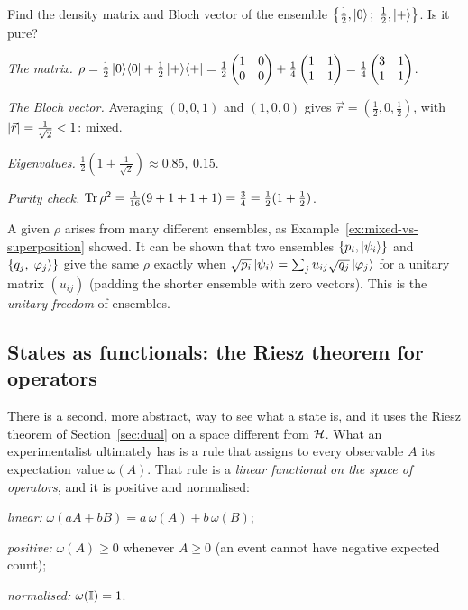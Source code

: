 \begin{example}\label{ex:mixture-bloch}
  Find the density matrix and Bloch vector of the ensemble $\bigl\{\tfrac12,\ket0;\ \tfrac12,\ket+\bigr\}$. Is it pure?
\end{example}
\begin{solution}
  \begin{steps}
    \item \emph{The matrix.} $\rho=\tfrac12\left|0\right\rangle\!\left\langle0\right|+\tfrac12\left|+\right\rangle\!\left\langle+\right|=\tfrac12\begin{pmatrix}1&0\\0&0\end{pmatrix}+\tfrac14\begin{pmatrix}1&1\\1&1\end{pmatrix}=\tfrac14\begin{pmatrix}3&1\\1&1\end{pmatrix}$.
    \item \emph{The Bloch vector.} Averaging $(0,0,1)$ and $(1,0,0)$ gives $\vec r=(\tfrac12,0,\tfrac12)$, with $\left|\vec r\right|=\tfrac1{\sqrt2}<1$: mixed.
    \item \emph{Eigenvalues.} $\tfrac12(1\pm\tfrac1{\sqrt2})\approx0.85,\ 0.15$.
    \item \emph{Purity check.} $\operatorname{Tr}\rho^2=\tfrac1{16}(9+1+1+1)=\tfrac34=\tfrac12(1+\tfrac12)$.
  \end{steps}
\end{solution}

\begin{remark}
  A given $\rho$ arises from many different ensembles, as Example~\ref{ex:mixed-vs-superposition} showed. It can be shown that two ensembles $\{p_i,\left|\psi_i\right\rangle\}$ and $\{q_j,\left|\varphi_j\right\rangle\}$ give the same $\rho$ exactly when $\sqrt{p_i}\left|\psi_i\right\rangle=\sum_ju_{ij}\sqrt{q_j}\left|\varphi_j\right\rangle$ for a unitary matrix $(u_{ij})$ (padding the shorter ensemble with zero vectors). This is the \emph{unitary freedom} of ensembles.
\end{remark}

\subsection{States as functionals: the Riesz theorem for operators}

There is a second, more abstract, way to see what a state is, and it uses the Riesz theorem of Section~\ref{sec:dual} on a space different from $\mathcal{H}$. What an experimentalist ultimately has is a rule that assigns to every observable $A$ its expectation value $\omega(A)$. That rule is a \emph{linear functional on the space of operators}, and it is positive and normalised:
\begin{steps}
  \item \emph{linear:} $\omega(aA+bB)=a\,\omega(A)+b\,\omega(B)$;
  \item \emph{positive:} $\omega(A)\ge0$ whenever $A\ge0$ (an event cannot have negative expected count);
  \item \emph{normalised:} $\omega(\mathbb{I})=1$.
\end{steps}

